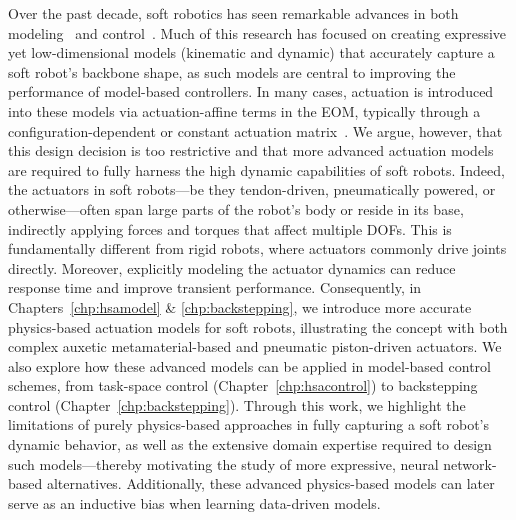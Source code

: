 Over the past decade, soft robotics has seen remarkable advances in both modeling~\citep{armanini2023soft} and control~\citep{della2023model}. Much of this research has focused on creating expressive yet low-dimensional models (kinematic and dynamic) that accurately capture a soft robot’s backbone shape, as such models are central to improving the performance of model-based controllers.
%
In many cases, actuation is introduced into these models via actuation-affine terms in the \gls{EOM}, typically through a configuration-dependent or constant actuation matrix~\citep{della2023model}. We argue, however, that this design decision is too restrictive and that more advanced actuation models are required to fully harness the high dynamic capabilities of soft robots. Indeed, the actuators in soft robots—be they tendon-driven, pneumatically powered, or otherwise—often span large parts of the robot’s body or reside in its base, indirectly applying forces and torques that affect multiple \glspl{DOF}. This is fundamentally different from rigid robots, where actuators commonly drive joints directly.
%
Moreover, explicitly modeling the actuator dynamics can reduce response time and improve transient performance. Consequently, in Chapters~\ref{chp:hsamodel} \& \ref{chp:backstepping}, we introduce more accurate physics-based actuation models for soft robots, illustrating the concept with both complex auxetic metamaterial-based and pneumatic piston-driven actuators. We also explore how these advanced models can be applied in model-based control schemes, from task-space control (Chapter~\ref{chp:hsacontrol}) to backstepping control (Chapter~\ref{chp:backstepping}). Through this work, we highlight the limitations of purely physics-based approaches in fully capturing a soft robot’s dynamic behavior, as well as the extensive domain expertise required to design such models—thereby motivating the study of more expressive, neural network-based alternatives. Additionally, these advanced physics-based models can later serve as an inductive bias when learning data-driven models.

